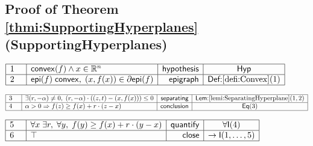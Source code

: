 \documentclass[11pt,reqno]{amsart}
\providecommand{\R}{\mathbb{R}}
\begin{document}
	\subsection*{Proof of Theorem \protect\ref{thmi:SupportingHyperplanes} (\textsf{SupportingHyperplanes})}
	\noindent$\begin{array}{|m{0.5cm}|l|r|c|}
	\hline
	1 & \mathsf{convex}(f)\wedge x\in\R^{n} & \mathsf{hypothesis} & \mathsf{Hyp} \\ \hline
	2 & \mathsf{epi}(f)\;\mathsf{convex},\;(x,f(x))\in\partial\mathsf{epi}(f) & \mathsf{epigraph} & \textsf{Def:}\ref{defi:Convex}(1) \\ \hline
	\end{array}$
	\par\nointerlineskip\noindent$\begin{array}{|m{0.5cm}|l|r|c|}
	\hline
	3 & \exists(r,-\alpha)\neq0,\;(r,-\alpha)\cdot((z,t)-(x,f(x)))\le0 & \mathsf{separating} & \textsf{Lem:}\ref{lemi:SeparatingHyperplane}(1,2) \\ \hline
	4 & \alpha>0\Rightarrow f(z)\ge f(x)+r\cdot(z-x) & \mathsf{conclusion} & \mathsf{Eq}(3) \\ \hline
	\end{array}$
	\par\nointerlineskip\noindent$\begin{array}{|m{0.5cm}|l|r|c|}
	\hline
	5 & \forall x\;\exists r,\;\forall y,\;f(y)\ge f(x)+r\cdot(y-x) & \mathsf{quantify} & \forall\mathsf{I}(4) \\ \hline
	6 & \top & \mathsf{close} & \to\mathsf{I}(1,\dots,5) \\ \hline
	\end{array}$
	\medskip
	
\end{document}
